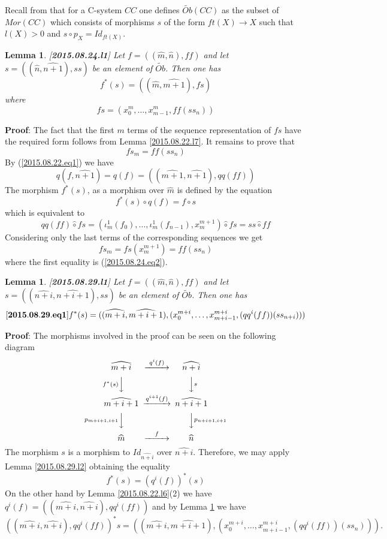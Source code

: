 \documentclass[11pt]{article}
\newenvironment{eq}{\begin{equation}}{\end{equation}}
\newenvironment{proof}{{\bf Proof}:}{\vskip 5mm }
\newtheorem{lemma}[proposition]{Lemma}
\newcommand{\llabel}[1]{\label{#1}[{\bf #1}]}
\newcommand{\sr}{\rightarrow}
\newcommand{\wt}{\widetilde}
\newcommand{\wh}{\widehat}
\newcommand{\hc}{\wh{\circ}}
\begin{document}
Recall from \cite{Csubsystems} that for a C-system $CC$ one defines $\wt{Ob}(CC)$ as the subset of $Mor(CC)$ which consists of morphisms $s$ of the form $ft(X)\sr X$ such that $l(X)>0$ and $s\circ p_X=Id_{ft(X)}$. 
%
\begin{lemma}
\llabel{2015.08.24.l1}
Let $f=((\wh{m},\wh{n}),ff)$ and let $s=((\wh{n},\wh{n+1}),ss)$ be an element of $\wt{Ob}$. Then one has
%
$$f^*(s)=((\wh{m},\wh{m+1}),fs)$$
%
where 
%
$$fs=(x_0^m,\dots,x_{m-1}^m,ff(ss_n))$$
%
\end{lemma}
%
\begin{proof}
The fact that the first $m$ terms of the sequence representation of $fs$ have the required form follows from Lemma \ref{2015.08.22.l7}. It remains to prove that
%
$$fs_m=ff(ss_n)$$
%
By (\ref{2015.08.22.eq1}) we have  
%
$$q(f,\wh{n+1})=q(f)=((\wh{m+1},\wh{n+1}),qq(ff))$$
%
The morphism $f^*(s)$, as a morphism over $\wh{m}$ is defined by the equation
%
$$f^*(s)\circ q(f)=f\circ s$$
%
which is equivalent to
%
$$qq(ff)\hc fs=(\iota_m^1(f_0),\dots,\iota_m^1(f_{n-1}),x_m^{m+1})\hc fs=ss\hc ff$$
%
Considering only the last terms of the corresponding sequences we get
%
$$fs_{m}=fs(x_m^{m+1})=ff(ss_n)$$
%
where the first equality is (\ref{2015.08.24.eq2}). 
%
\end{proof}
%
\begin{lemma}
\llabel{2015.08.29.l1}
Let $f=((\wh{m},\wh{n}),ff)$ and let $s=((\wh{n+i},\wh{n+i+1}),ss)$ be an element of $\wt{Ob}$. Then one has
%
\begin{eq}\llabel{2015.08.29.eq1}
f^*(s)=((\wh{m+i},\wh{m+i+1}),(x_0^{m+i},\dots,x_{m+i-1}^{m+i},(qq^i(ff))(ss_{n+i})))
\end{eq}
%
\end{lemma}
%
\begin{proof}
The morphisms involved in the proof can be seen on the following diagram
%
$$
\begin{CD}
\wh{m+i} @>q^i(f)>> \wh{n+i}\\
@Vf^*(s)VV @VVsV\\
\wh{m+i+1} @>q^{i+1}(f)>> \wh{n+i+1}\\
@Vp_{m+i+1,i+1}VV @VVp_{n+i+1,i+1}V\\
\wh{m} @>f>> \wh{n}
\end{CD}
$$
%
The morphism $s$ is a morphism to $Id_{\wh{n+i}}$ over $\wh{n+i}$. Therefore, we may apply Lemma \ref{2015.08.29.l2} obtaining the equality
%
$$f^*(s)=(q^i(f))^*(s)$$
%
On the other hand by Lemma \ref{2015.08.22.l6}(2) we have $q^i(f)=((\wh{m+i},\wh{n+i}),qq^i(ff))$ and by Lemma \ref{2015.08.24.l1} we have
%
$$((\wh{m+i},\wh{n+i}),qq^i(ff))^*s=((\wh{m+i},\wh{m+i+1}),(x_0^{m+i},\dots,x_{m+i-1}^{m+i},(qq^i(ff))(ss_n))).$$
%
\end{proof}
\end{document}
